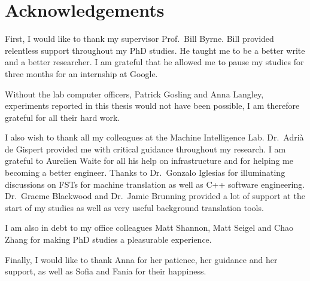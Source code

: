 \chapter*{Acknowledgements}

First, I would like to thank my supervisor
Prof.\ Bill Byrne.
Bill provided relentless support throughout
my PhD studies.
He taught me to be a better write and a better researcher.
I am grateful that he allowed
me to pause my studies for three months for
an internship at Google.

Without the lab computer officers, Patrick Gosling
and Anna Langley, experiments reported in this thesis
would not have been possible, I am therefore
grateful for all their hard work.

I also wish to thank all my colleagues at
the Machine Intelligence Lab.
Dr.\ Adrià de Gispert provided me with
critical guidance throughout my research.
I am grateful to Aurelien Waite for all his
help on infrastructure and for helping me becoming
a better engineer.
Thanks to Dr.\ Gonzalo Iglesias for illuminating
discussions on FSTs for machine translation as well
as C++ software engineering.
Dr.\ Graeme Blackwood and Dr.\ Jamie Brunning
provided a lot of support at the start of my studies as
well as very useful background translation tools.

I am also in debt to my office colleagues Matt Shannon, Matt Seigel
and Chao Zhang for making PhD studies a pleasurable experience.

Finally, I would like to thank Anna for her patience, her guidance and
her support, as well as Sofia and Fania for their happiness.
